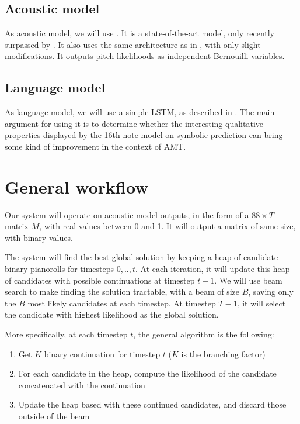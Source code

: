 \documentclass{article}
\begin{document}
\subsection{Acoustic model}

As acoustic model, we will use \citep{Kelz2016}.
It is a state-of-the-art model, only recently surpassed by \citep{Hawthorne2018}.
It also uses the same architecture as in \citep{sigtia2016end}, with only slight modifications.
It outputs pitch likelihoods as independent Bernouilli variables.

\subsection{Language model}

As language model, we will use a simple LSTM, as described in \citep{Ycart2017}.
The main argument for using it is to determine whether the interesting qualitative properties displayed by the 16th note model on symbolic prediction can bring some kind of improvement in the context of AMT.


\section{General workflow}
\label{sec:workflow}

Our system will operate on acoustic model outputs, in the form of a $88\times T$ matrix $M$,
with real values between 0 and 1.
It will output a matrix of same size, with binary values.

The system will find the best global solution by keeping a heap of candidate binary pianorolls
for timesteps $0,..,t$.
At each iteration, it will update this heap of candidates with possible continuations at timestep $t+1$. We will use beam search to make finding the solution tractable, with a beam of size $B$, saving only the $B$ most likely candidates at each timestep.
At timestep $T-1$, it will select the candidate with highest likelihood as the global solution.

More specifically, at each timestep $t$, the general algorithm is the following:

\begin{enumerate}
\item Get $K$ binary continuation for timestep $t$ ($K$ is the branching factor)
\item For each candidate in the heap, compute the likelihood of the candidate concatenated with the continuation
\item Update the heap based with these continued candidates, and discard those outside of the beam
\end{enumerate}
\end{document}

